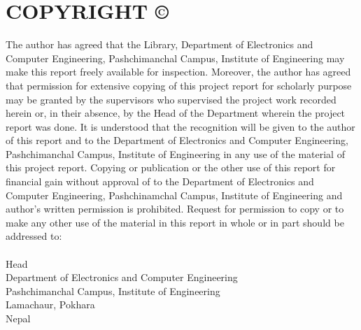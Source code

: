 \setcounter{page}{2}
\chapter*{COPYRIGHT ©}
\justify
The author has agreed that the Library, Department of Electronics and Computer
Engineering, Pashchimanchal Campus, Institute of Engineering may make this report
freely available for inspection. Moreover, the author has agreed that permission for
extensive copying of this project report for scholarly purpose may be granted by the
supervisors who supervised the project work recorded herein or, in their absence, by the
Head of the Department wherein the project report was done. It is understood that the
recognition will be given to the author of this report and to the Department of
Electronics and Computer Engineering, Pashchimanchal Campus, Institute of
Engineering in any use of the material of this project report. Copying or publication or
the other use of this report for financial gain without approval of to the Department of
Electronics and Computer Engineering, Pashchinamchal Campus, Institute of
Engineering and author’s written permission is prohibited.
Request for permission to copy or to make any other use of the material in this report in
whole or in part should be addressed to:\\
\\
Head\\
Department of Electronics and Computer Engineering\\
Pashchimanchal Campus, Institute of Engineering\\
Lamachaur, Pokhara\\
Nepal\\